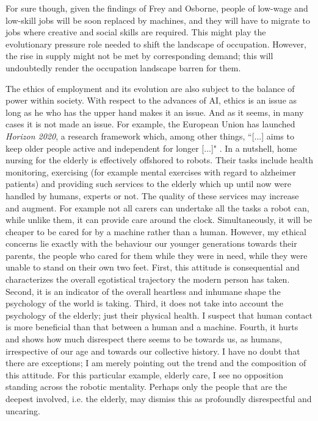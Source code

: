 \documentclass[12pt]{article}
\begin{document}
For sure though, given the findings of Frey and Osborne, people of low-wage and low-skill jobs will be soon replaced by machines, and they will have to migrate to jobs where creative and social skills are required. This might play the evolutionary pressure role needed to shift the landscape of occupation. However, the rise in supply might not be met by corresponding demand; this will undoubtedly render the occupation landscape barren for them.


The ethics of employment and its evolution are also subject to the balance of power within society. With respect to the advances of AI, ethics is an issue as long as he who has the upper hand makes it an issue. And as it seems, in many cases it is not made an issue. For example, the European Union has launched \textit{Horizon 2020}, a research framework which, among other things, ``[...] aims to keep older people active and independent for longer [...]" \cite{H20}. In a nutshell, home nursing for the elderly is effectively offshored to robots. Their tasks include health monitoring, exercising (for example mental exercises with regard to alzheimer patients) and providing such services to the elderly which up until now were handled by humans, experts or not. The quality of these services may increase and augment. For example not all carers can undertake all the tasks a robot can, while unlike them, it can provide care around the clock. Simultaneously, it will be cheaper to be cared for by a machine rather than a human. However, my ethical concerns lie exactly with the behaviour our younger generations towards their parents, the people who cared for them while they were in need, while they were unable to stand on their own two feet. First, this attitude is consequential and characterizes the overall egotistical trajectory the modern person has taken. Second, it is an indicator of the overall heartless and inhumane shape the psychology of the world is taking. Third, it does not take into account the psychology of the elderly; just their physical health. I suspect that human contact is more beneficial than that between a human and a machine. Fourth, it hurts and shows how much disrespect there seems to be towards us, as humans, irrespective of our age and towards our collective history. I have no doubt that there are exceptions; I am merely pointing out the trend and the composition of this attitude. For this particular example, elderly care, I see no opposition standing across the robotic mentality. Perhaps only the people that are the deepest involved, i.e. the elderly, may dismiss this as profoundly disrespectful and uncaring.



\end{document}
